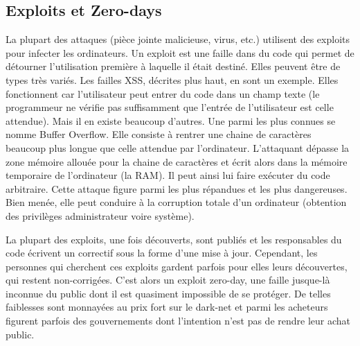 \documentclass[article, french]{yReport}
\begin{document}
	\subsection{Exploits et Zero-days}
	\label{sec:exploits}
	La plupart des attaques (pièce jointe malicieuse, virus, etc.) utilisent des exploits pour infecter les ordinateurs. Un exploit est une faille dans du code qui permet de détourner l'utilisation première à laquelle il était destiné. Elles peuvent être de types très variés. Les failles XSS, décrites plus haut, en sont un exemple. Elles fonctionnent car l'utilisateur peut entrer du code dans un champ texte (le programmeur ne vérifie pas suffisamment que l'entrée de l'utilisateur est celle attendue). Mais il en existe beaucoup d'autres. Une parmi les plus connues se nomme Buffer Overflow. Elle consiste à rentrer une chaine de caractères beaucoup plus longue que celle attendue par l'ordinateur. L'attaquant dépasse la zone mémoire allouée pour la chaine de caractères et écrit alors dans la mémoire temporaire de l'ordinateur (la RAM). Il peut ainsi lui faire exécuter du code arbitraire. Cette attaque figure parmi les plus répandues et les plus dangereuses. Bien menée, elle peut conduire à la corruption totale d'un ordinateur (obtention des privilèges administrateur voire système).
	
	La plupart des exploits, une fois découverts, sont publiés et les responsables du code écrivent un correctif sous la forme d'une mise à jour. Cependant, les personnes qui cherchent ces exploits gardent parfois pour elles leurs découvertes, qui restent non-corrigées. C'est alors un exploit zero-day, une faille jusque-là inconnue du public dont il est quasiment impossible de se protéger. De telles faiblesses sont monnayées au prix fort sur le dark-net et parmi les acheteurs figurent parfois des gouvernements dont l'intention n'est pas de rendre leur achat public.
	
	\newpage
\end{document}
